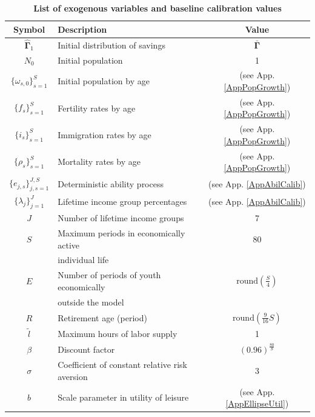 \documentclass[letterpaper,12pt]{article}
\theoremstyle{definition}
\begin{document}
\begin{spacing}{1.5}
    \begin{table}[htbp] \centering \captionsetup{width=4.7in}
    \caption{\label{TabExogVars}\textbf{List of exogenous variables and baseline calibration values}}
      \begin{threeparttable}
      \begin{tabular}{>{\footnotesize}c |>{\footnotesize}l |>{\footnotesize}c}
        \hline\hline
        Symbol & \quad\quad\quad\quad Description & Value \\
        \hline
        $\bm{\hat{\Gamma}}_1$ & Initial distribution of savings & $\bm{\bar{\Gamma}}$ \\
        $N_0$ & Initial population & 1 \\
        $\{\omega_{s,0}\}_{s=1}^S$ & Initial population by age & (see App. \ref{AppPopGrowth}) \\
        $\{f_s\}_{s=1}^S$ & Fertility rates by age & (see App. \ref{AppPopGrowth}) \\
        $\{i_s\}_{s=1}^S$ & Immigration rates by age & (see App. \ref{AppPopGrowth}) \\
        $\{\rho_s\}_{s=1}^S$ & Mortality rates by age & (see App. \ref{AppPopGrowth}) \\
        $\{e_{j,s}\}_{j,s=1}^{J,S}$ & Deterministic ability process & (see App. \ref{AppAbilCalib}) \\
        $\{\lambda_j\}_{j=1}^J$ & Lifetime income group percentages & (see App. \ref{AppAbilCalib}) \\
        $J$ & Number of lifetime income groups & 7 \\
        $S$ & Maximum periods in economically active & 80 \\[-2mm]
        &\quad individual life & \\
        $E$ & Number of periods of youth economically & $\text{round}\left(\frac{S}{4}\right)$ \\[-2mm]
        & \quad outside the model & \\
        $R$ & Retirement age (period) & $\text{round}\left(\frac{9}{16}S\right)$ \\
        \hline
        $\tilde{l}$ & Maximum hours of labor supply & 1 \\
        $\beta$ & Discount factor & $(0.96)^\frac{80}{S}$ \\
        $\sigma$ & Coefficient of constant relative risk aversion & 3 \\
        $b$ & Scale parameter in utility of leisure & (see App. \ref{AppEllipseUtil}) \\

\end{tabular}
\end{threeparttable}
\end{table}
\end{spacing}
\end{document}
